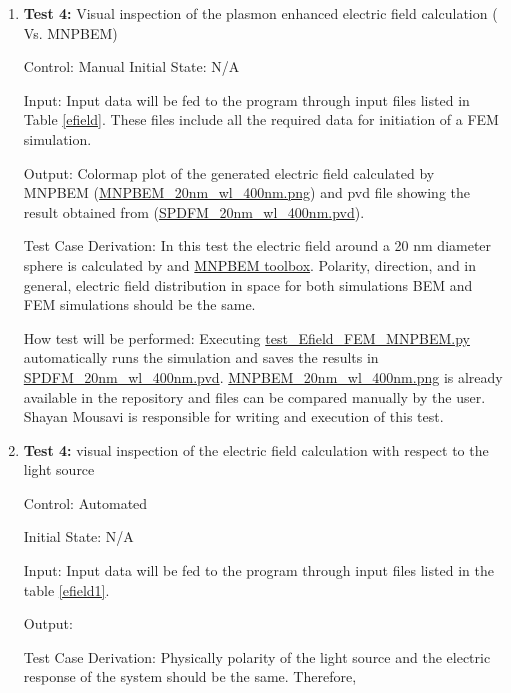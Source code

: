 \documentclass[12pt, titlepage]{article}
\begin{document}
\begin{enumerate}
		
		
	
	\item{\textbf{Test 4:} Visual inspection of the plasmon enhanced electric field calculation (\progname{} Vs. MNPBEM)\\}
	
	Control: Manual
	Initial State: N/A 
	
	Input: Input data will be fed to the program through input files listed in Table \ref{efield}. These files include all the required data for initiation of a FEM simulation.
	
	Output: Colormap plot of the generated electric field calculated by MNPBEM (\href{https://github.com/shmouses/SPDFM/tree/master/src/MNPBEM_12nm_wl_400nm.png}{MNPBEM\_20nm\_wl\_400nm.png}) and pvd file showing the result obtained from \progname{} (\href{https://github.com/shmouses/SPDFM/tree/master/src/SPDFM_20nm_wl_400nm.pvd}{SPDFM\_20nm\_wl\_400nm.pvd}).
	
	Test Case Derivation: In this test the electric field around a 20 nm diameter sphere is calculated by \progname{} and \href{https://physik.uni-graz.at/mnpbem/}{MNPBEM toolbox}. Polarity, direction, and in general, electric field distribution in space for both simulations BEM and FEM simulations should be the same.
	
	How test will be performed: Executing  \href{https://github.com/shmouses/SPDFM/tree/master/src/test_visual_ls.py}{test\_Efield\_FEM\_MNPBEM.py} automatically runs the \progname{} simulation and saves the results in \href{https://github.com/shmouses/SPDFM/tree/master/src/SPDFM_20nm_wl_400nm.pvd}{SPDFM\_20nm\_wl\_400nm.pvd}. \href{https://github.com/shmouses/SPDFM/tree/master/src/MNPBEM_12nm_wl_400nm.png}{MNPBEM\_20nm\_wl\_400nm.png} is already available in the repository and files can be compared manually by the user. Shayan Mousavi is responsible for writing and execution of this test.  
	
		
	\item{\textbf{Test 4:} visual inspection of the electric field calculation with respect to the light source \\}
	
	Control: Automated 
	
	Initial State: N/A 
	
	Input: Input data will be fed to the program through input files listed in the table \ref{efield1}.
	
	
	Output: 
	
	Test Case Derivation: Physically polarity of the light source and the electric response of the system should be the same. Therefore, 
	

\end{enumerate}
\end{document}
